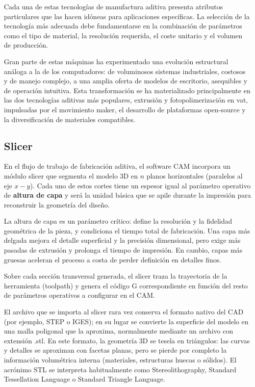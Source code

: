 Cada una de estas tecnologías de manufactura aditiva presenta atributos particulares que las hacen idóneas para aplicaciones específicas. La selección de la tecnología más adecuada debe fundamentarse en la combinación de parámetros como el tipo de material, la resolución requerida, el coste unitario y el volumen de producción.  

Gran parte de estas máquinas ha experimentado una evolución estructural análoga a la de los computadores: de voluminosos sistemas industriales, costosos y de manejo complejo, a una amplia oferta de modelos de escritorio, asequibles y de operación intuitiva. Esta transformación se ha materializado principalmente en las dos tecnologías aditivas más populares, extrusión y fotopolimerización en vat, impulsadas por el movimiento maker, el desarrollo de plataformas open-source y la diversificación de materiales compatibles.

\subsection{Slicer}

En el flujo de trabajo de fabricación aditiva, el software CAM incorpora un módulo slicer que segmenta el modelo 3D en $n$ planos horizontales (paralelos al eje $x-y$). Cada uno de estos cortes tiene un espesor igual al parámetro operativo de \textbf{altura de capa} y será la unidad básica que se apile durante la impresión para reconstruir la geometría del diseño.

La altura de capa es un parámetro crítico: define la resolución y la fidelidad geométrica de la pieza, y condiciona el tiempo total de fabricación. Una capa más delgada mejora el detalle superficial y la precisión dimensional, pero exige más pasadas de extrusión y prolonga el tiempo de impresión. En cambio, capas más gruesas aceleran el proceso a costa de perder definición en detalles finos.

Sobre cada sección transversal generada, el slicer traza la trayectoria de la herramienta (toolpath) y genera el código G correspondiente en función del resto de parámetros operativos a configurar en el CAM.

El archivo que se importa al slicer rara vez conserva el formato nativo del CAD (por ejemplo, STEP o IGES); en su lugar se convierte la superficie del modelo en una malla poligonal que la aproxima, normalmente mediante un archivo con extensión .stl. En este formato, la geometría 3D se tesela en triángulos: las curvas y detalles se aproximan con facetas planas, pero se pierde por completo la información volumétrica interna (materiales, estructuras huecas o sólidos). El acrónimo STL se interpreta habitualmente como Stereolithography, Standard Tessellation Language o Standard Triangle Language. 

